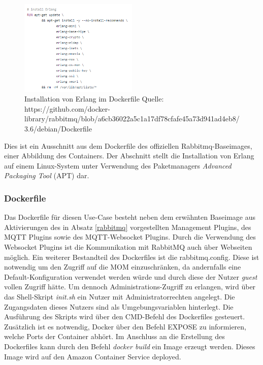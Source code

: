 \documentclass[paper,oneside,onecolumn,notitlepage,bibtotocnumbered,fontsize=12pt,bigheadings,ngerman]{scrartcl}
\begin{document}
\begin{figure}[htbp]
	\centering
	\includegraphics[width=0.5\textwidth]{Bilder/erlangDockerfile.png}
	\caption{Installation von Erlang im Dockerfile Quelle: https://github.com/docker-library/rabbitmq/blob/a6cb36022a5c1a17df78cfafe45a73d941ad4eb8/3.6/\-debian/Dockerfile}
	\label{img:erlangDockerfile}
\end{figure}
Dies ist ein Ausschnitt aus dem Dockerfile des offiziellen Rabbitmq-Baseimages, einer Abbildung des Containers. Der Abschnitt stellt die Installation von Erlang auf einem Linux-System unter Verwendung des Paketmanagers \textit{Advanced Packaging Tool} (APT) dar.
\subsubsection{Dockerfile}
Das Dockerfile für diesen Use-Case besteht neben dem erwähnten Baseimage aus Aktivierungen des in Absatz \ref{rabbitmq} vorgestellten Management Plugins, des MQTT Plugins sowie des MQTT-Websocket Plugins. Durch die Verwendung des Websocket Plugins ist die Kommunikation mit RabbitMQ auch über Webseiten möglich. Ein weiterer Bestandteil des Dockerfiles ist die rabbitmq.config. Diese ist notwendig um den Zugriff auf die MOM einzuschränken, da andernfalls eine Default-Konfiguration verwendet werden würde und durch diese der Nutzer \emph{guest} vollen Zugriff hätte. Um dennoch Administrations-Zugriff zu erlangen, wird über das Shell-Skript \textit{init.sh} ein Nutzer mit Administratorrechten angelegt. Die Zugangsdaten dieses Nutzers sind als Umgebungsvariablen hinterlegt. Die Ausführung des Skripts wird über den CMD-Befehl des Dockerfiles gesteuert. Zusätzlich ist es notwendig, Docker über den Befehl EXPOSE zu informieren, welche Ports der Container abhört. Im Anschluss an die Erstellung des Dockerfiles kann durch den Befehl \emph{docker build} ein Image erzeugt werden. Dieses Image wird auf den Amazon Container Service deployed.
\end{document}
